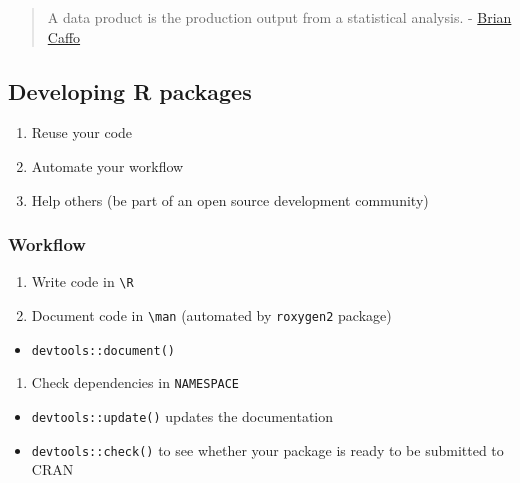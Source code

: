 \documentclass[
]{book}
\providecommand{\tightlist}{%
  \setlength{\itemsep}{0pt}\setlength{\parskip}{0pt}}
\begin{document}
\begin{quote}
A data product is the production output from a statistical analysis. - \href{https://sites.google.com/view/bcaffo/home}{Brian Caffo}
\end{quote}

\hypertarget{developing-r-packages}{%
\subsection{Developing R packages}\label{developing-r-packages}}

\begin{enumerate}
\def\labelenumi{\arabic{enumi}.}
\tightlist
\item
  Reuse your code
\item
  Automate your workflow
\item
  Help others (be part of an open source development community)
\end{enumerate}

\hypertarget{workflow}{%
\subsubsection{Workflow}\label{workflow}}

\begin{enumerate}
\def\labelenumi{\arabic{enumi}.}
\tightlist
\item
  Write code in \texttt{\textbackslash{}R}
\item
  Document code in \texttt{\textbackslash{}man} (automated by \texttt{roxygen2} package)
\end{enumerate}

\begin{itemize}
\tightlist
\item
  \texttt{devtools::document()}
\end{itemize}

\begin{enumerate}
\def\labelenumi{\arabic{enumi}.}
\setcounter{enumi}{2}
\tightlist
\item
  Check dependencies in \texttt{NAMESPACE}
\end{enumerate}

\begin{itemize}
\tightlist
\item
  \texttt{devtools::update()} updates the documentation
\item
  \texttt{devtools::check()} to see whether your package is ready to be submitted to CRAN
\end{itemize}
\end{document}

